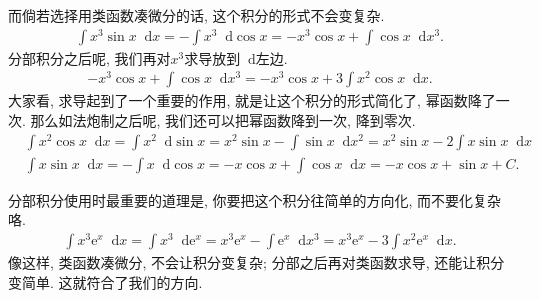 \documentclass{ctexbook}
\newcommand{\e}{\mathrm{e}}
\newcommand*{\dif}{\mathop{}\!\mathrm{d}}
\begin{document}
{而倘若选择用\uppercase\expandafter{}类函数凑微分的话, 这个积分的形式不会变复杂. 
\begin{align*}
\int x^{3}\sin{x}\dif{x}=-\int x^{3}\dif{\cos{x}}=-x^{3}\cos{x}+\int\cos{x}\dif{x^{3}}
.\end{align*}
分部积分之后呢, 我们再对$x^{3}$求导放到$\dif$左边. 
\begin{align*}
-x^{3}\cos{x}+\int\cos{x}\dif{x^{3}}=-x^{3}\cos{x}+3\int x^{2}\cos{x}\dif{x}
.\end{align*}
大家看, 求导起到了一个重要的作用, 就是让这个积分的形式简化了, 幂函数降了一次. 那么如法炮制之后呢, 我们还可以把幂函数降到一次, 降到零次. 
\begin{align*}
{}&\int x^{2}\cos{x}\dif{x}=\int x^{2}\dif{\sin{x}}=x^{2}\sin{x}-\int\sin{x}\dif{x^{2}}=x^{2}\sin{x}-2\int x\sin{x}\dif{x}\\
{}&\int x\sin{x}\dif{x}=-\int x\dif{\cos{x}}=-x\cos{x}+\int\cos{x}\dif{x}=-x\cos{x}+\sin{x}+C
.\end{align*}\par
分部积分使用时最重要的道理是, 你要把这个积分往简单的方向化, 而不要化复杂咯. 
\begin{align*}
\int x^{3}\e^{x}\dif{x}=\int x^{3}\dif{\e^{x}}=x^{3}\e^{x}-\int\e^{x}\dif{x^{3}}=x^{3}\e^{x}-3\int x^{2}\e^{x}\dif{x}
.\end{align*}
像这样, \uppercase\expandafter{}类函数凑微分, 不会让积分变复杂; 分部之后再对\uppercase\expandafter{}类函数求导, 还能让积分变简单. 这就符合了我们的方向. \par
}
\end{document}
